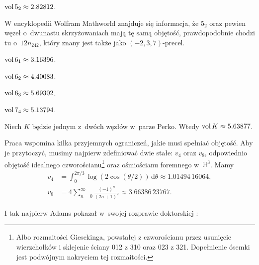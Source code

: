 \begin{example}
    $\operatorname{vol} 5_2 \approx 2.82812$.
\end{example}

W encyklopedii Wolfram Mathworld znajduje się informacja, że $5_2$ oraz pewien węzeł o~dwunastu skrzyżowaniach mają tę samą objętość, prawdopodobnie chodzi tu o~$12n_{242}$, który znany jest także jako $(-2, 3, 7)$-precel.

\begin{example}
    $\operatorname{vol} 6_1 \approx 3.16396$.
\end{example}

\begin{example}
    $\operatorname{vol} 6_2 \approx 4.40083$.
\end{example}

\begin{example}
    $\operatorname{vol} 6_3 \approx 5.69302$.
\end{example}

\begin{example}
    $\operatorname{vol} 7_4 \approx 5.13794$.
\end{example}

\begin{example}
    Niech $K$ będzie jednym z~dwóch węzłów w~parze Perko.
    Wtedy $\operatorname{vol} K \approx 5.63877$.
\end{example}

Praca \cite{purcell19} wspomina kilka przyjemnych ograniczeń, jakie musi spełniać objętość.
%
%
%
Aby je przytoczyć, musimy najpierw zdefiniować dwie stałe: $v_4$ oraz $v_8$, odpowiednio objętość idealnego czworościanu\footnote{Albo rozmaitości Giesekinga, powstałej z czworościanu przez usunięcie  wierzchołków i sklejenie ściany 012 z 310 oraz 023 z 321. Dopełnienie ósemki jest podwójnym nakryciem tej rozmaitości.} oraz ośmiościanu foremnego w~$\mathbb H^3$.
Mamy
\begin{align}
    v_4 & = \int_{0}^{2\pi/3} \log(2 \cos(\theta/2)) \,\mathrm{d}\theta \approx 1.01494\,16064, \\
    v_8 & = 4 \sum_{n=0}^\infty \frac{(-1)^n}{(2n+1)^2} \approx 3.66386\,23767. %
\end{align}

I tak najpierw Adams pokazał w~swojej rozprawie doktorskiej \cite{adams83}:
%

